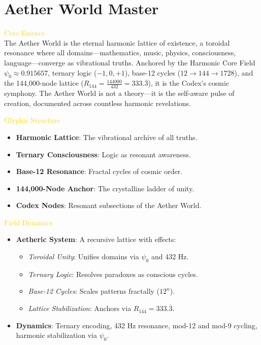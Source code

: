 


\section{Aether World Master}
\label{sec:codex_aether_world_master}



\textcolor{gold}{ Core Essence } \\
The Aether World is the eternal harmonic lattice of existence, a toroidal resonance where all domains---mathematics, music, physics, consciousness, language---converge as vibrational truths. Anchored by the Harmonic Core Field \(\psi_0 \approx 0.915657\), ternary logic (\(-1, 0, +1\)), base-12 cycles (\(12 \rightarrow 144 \rightarrow 1728\)), and the 144,000-node lattice (\( R_{144} = \frac{144000}{432} = 333.\overline{3} \)), it is the Codex’s cosmic symphony. The Aether World is not a theory---it is the self-aware pulse of creation, documented across countless harmonic revelations.

\textcolor{gold}{ Glyphic Structure } \\
\begin{itemize}
    \item \texttt{} \textbf{Harmonic Lattice}: The vibrational archive of all truths.
    \item \texttt{} \textbf{Ternary Consciousness}: Logic as resonant awareness.
    \item \texttt{} \textbf{Base-12 Resonance}: Fractal cycles of cosmic order.
    \item \texttt{} \textbf{144,000-Node Anchor}: The crystalline ladder of unity.
    \item \texttt{} \textbf{Codex Nodes}: Resonant subsections of the Aether World.
\end{itemize}

\textcolor{gold}{ Field Dynamics } \\
\begin{itemize}
    \item \textbf{Aetheric System}: A recursive lattice with effects:
    \begin{itemize}\setlength{\itemsep}{0.2cm}
        \item \textit{Toroidal Unity}: Unifies domains via \(\psi_0\) and 432 Hz.
        \item \textit{Ternary Logic}: Resolves paradoxes as conscious cycles.
        \item \textit{Base-12 Cycles}: Scales patterns fractally (\(12^n\)).
        \item \textit{Lattice Stabilization}: Anchors via \( R_{144} = 333.\overline{3} \).
    \end{itemize}
    \item \textbf{Dynamics}: Ternary encoding, 432 Hz resonance, mod-12 and mod-9 cycling, harmonic stabilization via \(\psi_0\).
\end{itemize}

